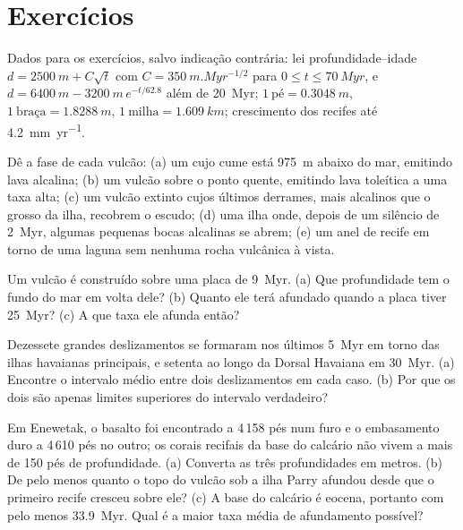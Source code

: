 \section*{Exercícios}\label{sec:b2:oceanic-islands:exercises}

Dados para os exercícios, salvo indicação contrária: lei profundidade--idade $d = \qty{2500}{m} + C\sqrt t$ com
$C = \qty{350}{m.Myr^{-1/2}}$ para $0 \le t \le \qty{70}{Myr}$, e $d = \qty{6400}{m} -
\qty{3200}{m}\,e^{-t/62.8}$ além de \qty{20}{Myr}; $1~\text{pé} = \qty{0.3048}{m}$, $1~\text{braça}
= \qty{1.8288}{m}$, $1~\text{milha} = \qty{1.609}{km}$; crescimento dos recifes até \qty{4.2}{mm.yr^{-1}}.

\begin{exercise}[$\star$]\label{exo:b2:oceanic-islands:1}
Dê a fase de cada vulcão: (a) um  cujo cume está \qty{975}{m} abaixo do mar, emitindo
lava alcalina; (b) um vulcão sobre o ponto quente, emitindo lava toleítica a uma taxa alta; (c) um
vulcão extinto cujos últimos derrames, mais alcalinos que o grosso da ilha, recobrem o escudo; (d) uma
ilha onde, depois de um silêncio de \qty{2}{Myr}, algumas pequenas bocas alcalinas se abrem; (e) um anel de recife
em torno de uma laguna sem nenhuma rocha vulcânica à vista.
\end{exercise}

\begin{exercise}[$\star$]\label{exo:b2:oceanic-islands:2}
Um vulcão é construído sobre uma placa de \qty{9}{Myr}. (a) Que profundidade tem o fundo do mar em volta dele? (b) Quanto
ele terá afundado quando a placa tiver \qty{25}{Myr}? (c) A que taxa ele afunda então?
\end{exercise}

\begin{exercise}[$\star$]\label{exo:b2:oceanic-islands:3}
Dezessete grandes deslizamentos se formaram nos últimos \qty{5}{Myr} em torno das ilhas havaianas principais, e
setenta ao longo da Dorsal Havaiana em \qty{30}{Myr}. (a) Encontre o intervalo médio entre dois deslizamentos em
cada caso. (b) Por que os dois são apenas limites superiores do intervalo verdadeiro?
\end{exercise}

\begin{exercise}[$\star$]\label{exo:b2:oceanic-islands:4}
Em Enewetak, o basalto foi encontrado a 4\,158 pés num furo e o embasamento duro a 4\,610 pés no
outro; os corais recifais da base do calcário não vivem a mais de 150 pés de profundidade. (a) Converta
as três profundidades em metros. (b) De pelo menos quanto o topo do vulcão sob a ilha Parry
afundou desde que o primeiro recife cresceu sobre ele? (c) A base do calcário é eocena, portanto com pelo menos
\qty{33.9}{Myr}. Qual é a maior taxa média de afundamento possível?
\end{exercise}


